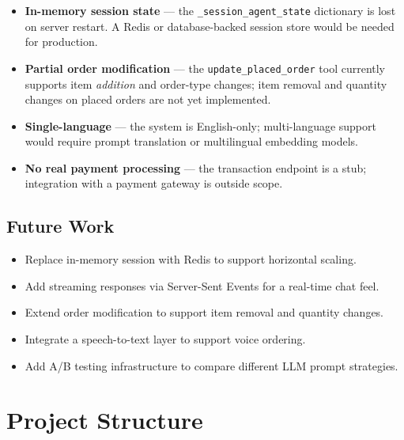 \documentclass[12pt,a4paper]{report}
\begin{document}
\begin{itemize}
    \item \textbf{In-memory session state} — the \texttt{\_session\_agent\_state}
          dictionary is lost on server restart. A Redis or database-backed session
          store would be needed for production.
    \item \textbf{Partial order modification} — the \texttt{update\_placed\_order}
          tool currently supports item \textit{addition} and order-type changes;
          item removal and quantity changes on placed orders are not yet implemented.
    \item \textbf{Single-language} — the system is English-only; multi-language support
          would require prompt translation or multilingual embedding models.
    \item \textbf{No real payment processing} — the transaction endpoint is a stub;
          integration with a payment gateway is outside scope.
\end{itemize}

\section{Future Work}

\begin{itemize}
    \item Replace in-memory session with Redis to support horizontal scaling.
    \item Add streaming responses via Server-Sent Events for a real-time chat feel.
    \item Extend order modification to support item removal and quantity changes.
    \item Integrate a speech-to-text layer to support voice ordering.
    \item Add A/B testing infrastructure to compare different LLM prompt strategies.
\end{itemize}

\appendix
\chapter{Project Structure}
\end{document}
